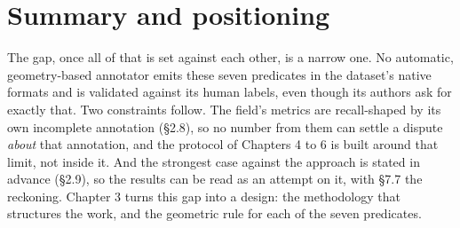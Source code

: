 \section{Summary and positioning}

The gap, once all of that is set against each other, is a narrow one. No automatic, geometry-based annotator emits these seven predicates in the dataset's native formats and is validated against its human labels, even though its authors ask for exactly that. Two constraints follow. The field's metrics are recall-shaped by its own incomplete annotation (\S{}2.8), so no number from them can settle a dispute \textit{about} that annotation, and the protocol of Chapters 4 to 6 is built around that limit, not inside it. And the strongest case against the approach is stated in advance (\S{}2.9), so the results can be read as an attempt on it, with \S{}7.7 the reckoning. Chapter 3 turns this gap into a design: the methodology that structures the work, and the geometric rule for each of the seven predicates.